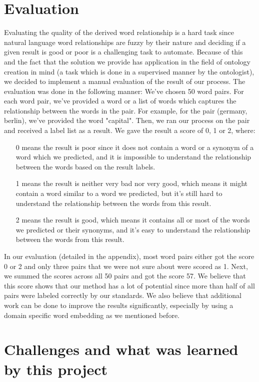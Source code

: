 \documentclass[11pt,a4paper]{article}
\begin{document}
\section{Evaluation}
Evaluating the quality of the derived word relationship is a hard task since natural language word relationships are fuzzy by their nature and deciding if a given result is good or poor is a challenging task to automate. Because of this and the fact that the solution we provide has application in the field of ontology creation in mind (a task which is done in a supervised manner by the ontologist), we decided to implement a manual evaluation of the result of our process.
The evaluation was done in the following manner: We've chosen 50 word pairs. For each word pair, we've provided a word or a list of words which captures the relationship between the words in the pair. For example, for the pair (germany, berlin), we've provided the word "capital". Then, we ran our process on the pair and received a label list as a result. We gave the result a score of 0, 1 or 2, where:

\begin{enumerate}
\item[0] means the result is poor since it does not contain a word or a synonym of a word which we predicted, and it is impossible to understand the relationship between the words based on the result labels.
\item[1] means the result is neither very bad nor very good, which means it might contain a word similar to a word we predicted, but it's still hard to understand the relationship between the words from this result.
\item[2] means the result is good, which means it contains all or most of the words we predicted or their synonyms, and it's easy to understand the relationship between the words from this result.
\end{enumerate}

In our evaluation (detailed in the appendix), most word pairs either got the score 0 or 2 and only three pairs that we were not sure about were scored as 1.
Next, we summed the scores across all 50 pairs and got the score 57. We believe that this score shows that our method has a lot of potential since more than half of all pairs were labeled correctly by our standards. We also believe that additional work can be done to improve the results significantly, especially by using a domain specific word embedding as we mentioned before.

\section{Challenges and what was learned by this project}
\end{document}
